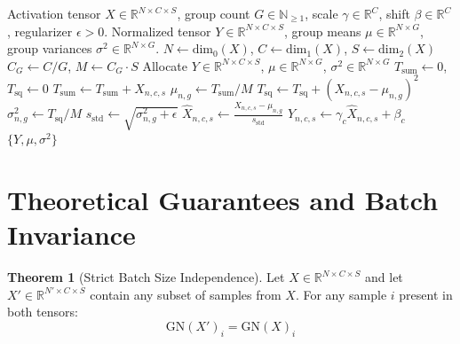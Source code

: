 \documentclass[11pt,a4paper]{article}
\theoremstyle{definition}
\newtheorem{theorem}{Theorem}[section]
\begin{document}
\begin{algorithm}[H]
\caption{Group Normalization Forward Pass}
\label{alg:group_norm}
\begin{algorithmic}[1]
\Require Activation tensor $X \in \mathbb{R}^{N \times C \times S}$, group count $G \in \mathbb{N}_{\ge 1}$, scale $\gamma \in \mathbb{R}^C$, shift $\beta \in \mathbb{R}^C$, regularizer $\epsilon > 0$.
\Ensure Normalized tensor $Y \in \mathbb{R}^{N \times C \times S}$, group means $\mu \in \mathbb{R}^{N \times G}$, group variances $\sigma^2 \in \mathbb{R}^{N \times G}$.
\State $N \gets \text{dim}_0(X)$, $C \gets \text{dim}_1(X)$, $S \gets \text{dim}_2(X)$
\State $C_G \gets C / G$, $M \gets C_G \cdot S$
\State Allocate $Y \in \mathbb{R}^{N \times C \times S}$, $\mu \in \mathbb{R}^{N \times G}$, $\sigma^2 \in \mathbb{R}^{N \times G}$
        \State $T_{\text{sum}} \gets 0$, $T_{\text{sq}} \gets 0$
                \State $T_{\text{sum}} \gets T_{\text{sum}} + X_{n, c, s}$
            \EndFor
        \EndFor
        \State $\mu_{n, g} \gets T_{\text{sum}} / M$
                \State $T_{\text{sq}} \gets T_{\text{sq}} + (X_{n, c, s} - \mu_{n, g})^2$
            \EndFor
        \EndFor
        \State $\sigma_{n, g}^2 \gets T_{\text{sq}} / M$
        \State $s_{\text{std}} \gets \sqrt{\sigma_{n, g}^2 + \epsilon}$
                \State $\hat{X}_{n, c, s} \gets \frac{X_{n, c, s} - \mu_{n, g}}{s_{\text{std}}}$
                \State $Y_{n, c, s} \gets \gamma_c \hat{X}_{n, c, s} + \beta_c$
            \EndFor
        \EndFor
    \EndFor
\EndFor
\State \Return $\{Y, \mu, \sigma^2\}$
\end{algorithmic}
\end{algorithm}

\section{Theoretical Guarantees and Batch Invariance}

\begin{theorem}[Strict Batch Size Independence]
Let $X \in \mathbb{R}^{N \times C \times S}$ and let $X' \in \mathbb{R}^{N' \times C \times S}$ contain any subset of samples from $X$. For any sample $i$ present in both tensors:
\begin{equation}
\text{GN}(X')_i = \text{GN}(X)_i
\end{equation}
\end{theorem}
\end{document}
